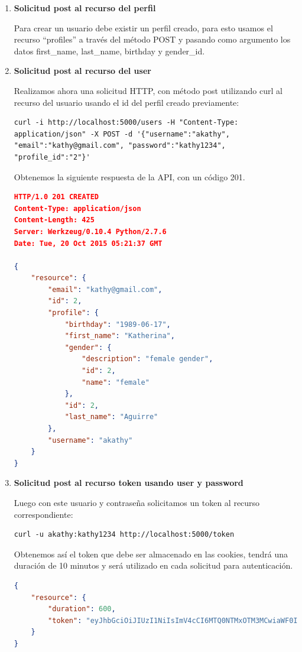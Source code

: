 \documentclass[a4paper,12pt]{article}
\begin{document}
\begin{enumerate}
	\item \textbf{Solicitud post al recurso del perfil}
    
	Para crear un usuario debe existir un perfil creado, para esto usamos el recurso ``\/profiles'' a través del método POST y pasando como argumento los datos first\_name, last\_name, birthday y gender\_id.
    \item \textbf{Solicitud post al recurso del user}
    
    Realizamos ahora una solicitud HTTP, con método post utilizando curl al recurso del usuario usando el id del perfil creado previamente:

\begin{verbatim}
curl -i http://localhost:5000/users -H "Content-Type: 
application/json" -X POST -d '{"username":"akathy", 
"email":"kathy@gmail.com", "password":"kathy1234", 
"profile_id":"2"}'
\end{verbatim}
    
    Obtenemos la siguiente respuesta de la API, con un código 201.
    
\begin{lstlisting}[language=json]
HTTP/1.0 201 CREATED
Content-Type: application/json
Content-Length: 425
Server: Werkzeug/0.10.4 Python/2.7.6
Date: Tue, 20 Oct 2015 05:21:37 GMT

{
    "resource": {
        "email": "kathy@gmail.com", 
        "id": 2, 
        "profile": {
            "birthday": "1989-06-17", 
            "first_name": "Katherina", 
            "gender": {
                "description": "female gender", 
                "id": 2, 
                "name": "female"
            }, 
            "id": 2, 
            "last_name": "Aguirre"
        }, 
        "username": "akathy"
    }
}
\end{lstlisting}

    \item \textbf{Solicitud post al recurso token usando user y password}
    
    Luego con este usuario y contraseña solicitamos un token al recurso correspondiente:

\begin{verbatim}
curl -u akathy:kathy1234 http://localhost:5000/token
\end{verbatim}
   
   Obtenemos así el token que debe ser almacenado en las cookies, tendrá una duración de 10 minutos y será utilizado en cada solicitud para autenticación.
   
\begin{lstlisting}[language=json]
{
    "resource": {
        "duration": 600, 
        "token": "eyJhbGciOiJIUzI1NiIsImV4cCI6MTQ0NTMxOTM3MCwiaWF0IjoxNDQ1MzE4NzcwfQ.eyJpZCI6Mn0.2eZRjbMq9tg4GykJx8EU-Ux4ZoyUW6WnBlADsvnpQvE"
    }
}
\end{lstlisting}

\end{enumerate}
\end{document}
